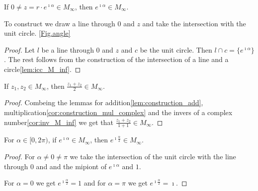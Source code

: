 \begin{lemma}
    \label{lem:angle_M_inf}
    \leanok
    If $0 \ne z = r\cdot e^{\imath\alpha} \in M_{\infty}$, then $e^{\imath\alpha} \in  M_{\infty}$.
\end{lemma}
To construct we draw a line through $0$ and $z$ and take the intersection with the unit circle. \ref{Fig.angle}

\begin{proof}

    Let $l$ be a line through $0$ and $z$ and $c$ be the unit circle. Then $l \cap c = \{e^{\imath\alpha}\}$.
    The rest follows from the construction of the intersection of a line and a circle\ref{lem:icc_M_inf}.
\end{proof}

\begin{corollary}
    \label{cor:Construction.midpoiont}
    \leanok
    If $z_1, z_2 \in M_{\infty}$, then $\frac{z_1 + z_2}{2} \in  M_{\infty}$.
    
\end{corollary}

\begin{proof}
    Combeing the lemmas for addition\ref{lem:construction_add}, multiplication\ref{cor:construction_mul_complex} and the invers of a complex number\ref{cor:inv_M_inf} we get that $\frac{z_1 + z_2}{1+1} \in M_{\infty}$.
\end{proof}

\begin{lemma}
    \label{lem:Construction.angle_half_M_inf}
    \leanok
    For $\alpha \in [0,2\pi)$, if $e^{\imath\alpha} \in M_{\infty}$, then $e^{\imath\frac{\alpha}{2}} \in  M_{\infty}$.
\end{lemma}
\begin{proof}
    For $\alpha \ne 0 \ne \pi$ we take the intersection of the unit circle with the line through $0$ and and the mipiont of $e^{\imath\alpha}$ and $1$. 
    
    For $\alpha = 0$ we get $e^{\imath\frac{\alpha}{2}} = 1$ and for $\alpha = \pi$ we get $e^{\imath\frac{\alpha}{2}} = \imath$.
    
\end{proof}

